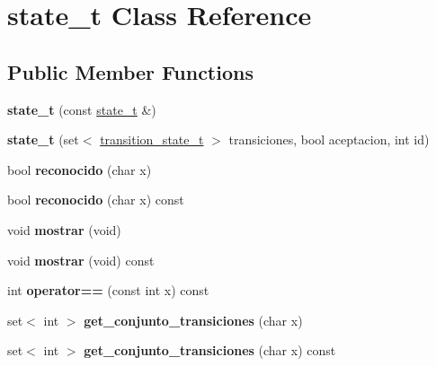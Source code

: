 \hypertarget{classstate__t}{}\section{state\+\_\+t Class Reference}
\label{classstate__t}
\subsection*{Public Member Functions}
\begin{DoxyCompactItemize}
\item 
\hypertarget{classstate__t_a5d77c831efb504e7e2a74d22b61875fb}{}\label{classstate__t_a5d77c831efb504e7e2a74d22b61875fb} 
{\bfseries state\+\_\+t} (const \hyperlink{classstate__t}{state\+\_\+t} \&)
\item 
\hypertarget{classstate__t_a490242435ea45c4d53c8dde58dd85803}{}\label{classstate__t_a490242435ea45c4d53c8dde58dd85803} 
{\bfseries state\+\_\+t} (set$<$ \hyperlink{classtransition__state__t}{transition\+\_\+state\+\_\+t} $>$ transiciones, bool aceptacion, int id)
\item 
\hypertarget{classstate__t_a29fb45b879014883ae3657cce7fd5c00}{}\label{classstate__t_a29fb45b879014883ae3657cce7fd5c00} 
bool {\bfseries reconocido} (char x)
\item 
\hypertarget{classstate__t_a7eaa735d1e679fe37d76837f9cbdc48d}{}\label{classstate__t_a7eaa735d1e679fe37d76837f9cbdc48d} 
bool {\bfseries reconocido} (char x) const
\item 
\hypertarget{classstate__t_aec1b8c7514fe4885df74bfe0f2dcba0d}{}\label{classstate__t_aec1b8c7514fe4885df74bfe0f2dcba0d} 
void {\bfseries mostrar} (void)
\item 
\hypertarget{classstate__t_a2b4a6276d35e34104bc3b0c953df5cdf}{}\label{classstate__t_a2b4a6276d35e34104bc3b0c953df5cdf} 
void {\bfseries mostrar} (void) const
\item 
\hypertarget{classstate__t_a5faeaf0b43ea114651e0562be3048d20}{}\label{classstate__t_a5faeaf0b43ea114651e0562be3048d20} 
int {\bfseries operator==} (const int x) const
\item 
\hypertarget{classstate__t_a46582d2dcd956cf4a32b528e6f761ddb}{}\label{classstate__t_a46582d2dcd956cf4a32b528e6f761ddb} 
set$<$ int $>$ {\bfseries get\+\_\+conjunto\+\_\+transiciones} (char x)
\item 
\hypertarget{classstate__t_a5ca40d0848909287e34228d70655e843}{}\label{classstate__t_a5ca40d0848909287e34228d70655e843} 
set$<$ int $>$ {\bfseries get\+\_\+conjunto\+\_\+transiciones} (char x) const

\end{DoxyCompactItemize}
